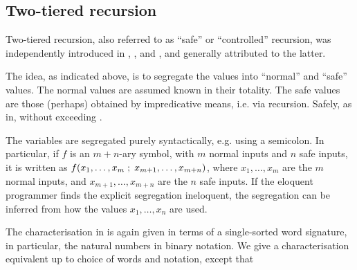 




\subsection{Two-tiered recursion}

Two-tiered recursion, also referred to as ``safe'' or ``controlled'' recursion,
was independently introduced in \cite{simmons-1988}, \cite{leivant-1990}, and
\cite{bellantoni-cook-1992}, and generally attributed to the latter.

The idea, as indicated above, is to segregate the values into ``normal'' and
``safe'' values. The normal values are assumed known in their totality. The
safe values are those (perhaps) obtained by impredicative means, i.e. via
recursion\cite{bellantoni-cook-1992, clote-1999}. Safely, as in, without
exceeding \FPTIME{}.

The variables are segregated purely syntactically, e.g. using a semicolon. In
particular, if $f$ is an $m+n$-ary symbol, with $m$ normal inputs and $n$ safe
inputs, it is written as $f{\mathopen{}\left({x_1,\ldots,x_m \mathrel{};\mathrel{}{} x_{m+1},\ldots,x_{m+n}}\right)\mathclose{}}$,
where $x_1,\ldots,x_m$ are the $m$ normal inputs, and $x_{m+1},\ldots,x_{m+n}$
are the $n$ safe inputs. If the eloquent programmer finds the explicit
segregation ineloquent, the segregation can be inferred from how the values
$x_1,\ldots,x_n$ are used\cite{caseiro-1996}.

The characterisation in \cite{bellantoni-cook-1992} is again given in terms of
a single-sorted word signature, in particular, the natural numbers in binary
notation. We give a characterisation equivalent up to choice of words and
notation, except that

